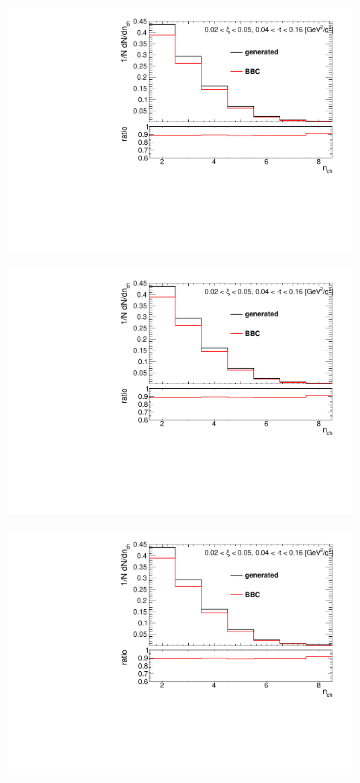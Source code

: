 \begin{figure}[h!]
	\centering
	\begin{subfigure}{.45\textwidth}
		\includegraphics[width=\textwidth,page=4]{chapters/chrgSTAR/img/bbcCorrection/xi_bbc.pdf}
	\end{subfigure}
	\begin{subfigure}{.45\textwidth}
		\includegraphics[width=\textwidth,page=8]{chapters/chrgSTAR/img/bbcCorrection/xi_bbc.pdf}
	\end{subfigure}
	\begin{subfigure}{.45\textwidth}
		\includegraphics[width=\textwidth,page=12]{chapters/chrgSTAR/img/bbcCorrection/xi_bbc.pdf}

\end{subfigure}
\end{figure}
